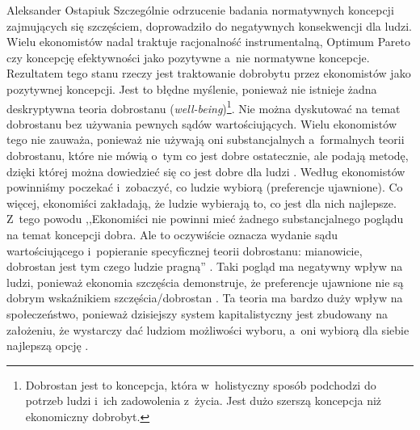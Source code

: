 \begin{artplenv}{Aleksander Ostapiuk}
Szczególnie odrzucenie badania normatywnych koncepcji zajmujących się szczęściem, doprowadziło do negatywnych
konsekwencji dla ludzi. Wielu ekonomistów nadal traktuje racjonalność instrumentalną, Optimum Pareto czy koncepcję
efektywności jako pozytywne a~nie normatywne koncepcje. Rezultatem tego stanu rzeczy jest traktowanie dobrobytu przez
ekonomistów jako pozytywnej koncepcji. Jest to błędne myślenie, ponieważ nie istnieje żadna deskryptywna teoria
dobrostanu (\textit{well-being})\footnote{Dobrostan jest to koncepcja, która w~holistyczny sposób podchodzi do potrzeb
ludzi i~ich zadowolenia z~życia. Jest dużo szerszą koncepcja niż ekonomiczny dobrobyt. }. Nie można dyskutować na temat
dobrostanu bez używania pewnych sądów wartościujących. Wielu ekonomistów tego nie zauważa, ponieważ nie używają oni
substancjalnych a~formalnych teorii dobrostanu, które nie mówią o~tym co jest dobre ostatecznie, ale podają metodę,
dzięki której można dowiedzieć się co jest dobre dla ludzi
\parencite[s.~245]{hausman_etyka_2017}.
Według ekonomistów powinniśmy poczekać i~zobaczyć, co ludzie wybiorą (preferencje ujawnione). Co więcej, ekonomiści
zakładają, że ludzie wybierają to, co jest dla nich najlepsze. Z~tego powodu ,,Ekonomiści nie powinni mieć żadnego
substancjalnego poglądu na temat koncepcji dobra. Ale to oczywiście oznacza wydanie sądu wartościującego i~popieranie
specyficznej teorii dobrostanu: mianowicie, dobrostan jest tym czego ludzie pragną''
\parencite[s.~214]{reiss_philosophy_2013}.
Taki pogląd ma negatywny wpływ na ludzi, ponieważ ekonomia szczęścia demonstruje, że preferencje
ujawnione nie są dobrym wskaźnikiem szczęścia/dobrostan
\parencites{bruni_economics_2005,bruni_handbook_2007}{bruni_capabilities_2008}%
{kahneman_well-being:_1999}{frey_what_2002}{frey_happiness_2010,frey_economics_2018}.
Ta teoria ma bardzo duży wpływ na
społeczeństwo, ponieważ dzisiejszy system kapitalistyczny jest zbudowany na założeniu, że wystarczy dać ludziom
możliwości wyboru, a~oni wybiorą dla siebie najlepszą opcję
\parencite[zob.][]{friedman_free_1980}.


\end{artplenv}
